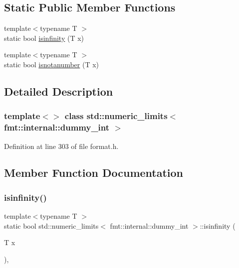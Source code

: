 \subsection*{Static Public Member Functions}
\begin{DoxyCompactItemize}
\item 
{\footnotesize template$<$typename T $>$ }\\static bool \hyperlink{classstd_1_1numeric__limits_3_01fmt_1_1internal_1_1dummy__int_01_4_ab87acbb0e3b785468702511d2ba20c43}{isinfinity} (T x)
\item 
{\footnotesize template$<$typename T $>$ }\\static bool \hyperlink{classstd_1_1numeric__limits_3_01fmt_1_1internal_1_1dummy__int_01_4_a66bfe9a9db1167477806c1973002e941}{isnotanumber} (T x)
\end{DoxyCompactItemize}


\subsection{Detailed Description}
\subsubsection*{template$<$$>$\newline
class std\+::numeric\+\_\+limits$<$ fmt\+::internal\+::dummy\+\_\+int $>$}



Definition at line 303 of file format.\+h.



\subsection{Member Function Documentation}
\mbox{\label{classstd_1_1numeric__limits_3_01fmt_1_1internal_1_1dummy__int_01_4_ab87acbb0e3b785468702511d2ba20c43}} 
\subsubsection{\texorpdfstring{isinfinity()}{isinfinity()}}
{\footnotesize\ttfamily template$<$typename T $>$ \\
static bool std\+::numeric\+\_\+limits$<$ fmt\+::internal\+::dummy\+\_\+int $>$\+::isinfinity (\begin{DoxyParamCaption}\item[{T}]{x }\end{DoxyParamCaption})\hspace{0.3cm}{\ttfamily [inline]}, {\ttfamily [static]}}



